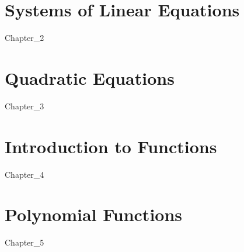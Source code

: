 \documentclass[11pt]{book}
\theoremstyle{definition}  %
\begin{document}
\chapter{Systems of Linear Equations}
\label{Systems of Linear Equations}
{Chapter_2}

\chapter{Quadratic Equations}
\label{Quadratic Equations}
{Chapter_3}

\chapter{Introduction to Functions}
\label{Introduction to Functions}
{Chapter_4}

\chapter{Polynomial Functions}
\label{Polynomial Functions}
{Chapter_5}



\printindex
\end{document}
